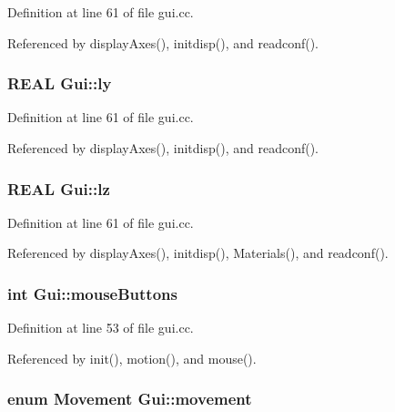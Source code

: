 Definition at line 61 of file gui.cc.

Referenced by displayAxes(), initdisp(), and readconf().\hypertarget{namespaceGui_c2a7515d6f755bd934cf19d75e7bc4d1}{
\subsubsection[{ly}]{\setlength{\rightskip}{0pt plus 5cm}REAL {\bf Gui::ly}}}
\label{namespaceGui_c2a7515d6f755bd934cf19d75e7bc4d1}




Definition at line 61 of file gui.cc.

Referenced by displayAxes(), initdisp(), and readconf().\hypertarget{namespaceGui_c87eeee68e3d6a4915b6d18e10eeca8b}{
\subsubsection[{lz}]{\setlength{\rightskip}{0pt plus 5cm}REAL {\bf Gui::lz}}}
\label{namespaceGui_c87eeee68e3d6a4915b6d18e10eeca8b}




Definition at line 61 of file gui.cc.

Referenced by displayAxes(), initdisp(), Materials(), and readconf().\hypertarget{namespaceGui_b7fec0b981b38104f3b9843f86c30839}{
\subsubsection[{mouseButtons}]{\setlength{\rightskip}{0pt plus 5cm}int {\bf Gui::mouseButtons}}}
\label{namespaceGui_b7fec0b981b38104f3b9843f86c30839}




Definition at line 53 of file gui.cc.

Referenced by init(), motion(), and mouse().\hypertarget{namespaceGui_993ed2a8e49cde7369fa3578802b851d}{
\subsubsection[{movement}]{\setlength{\rightskip}{0pt plus 5cm}enum {\bf Movement} {\bf Gui::movement}}}
\label{namespaceGui_993ed2a8e49cde7369fa3578802b851d}




